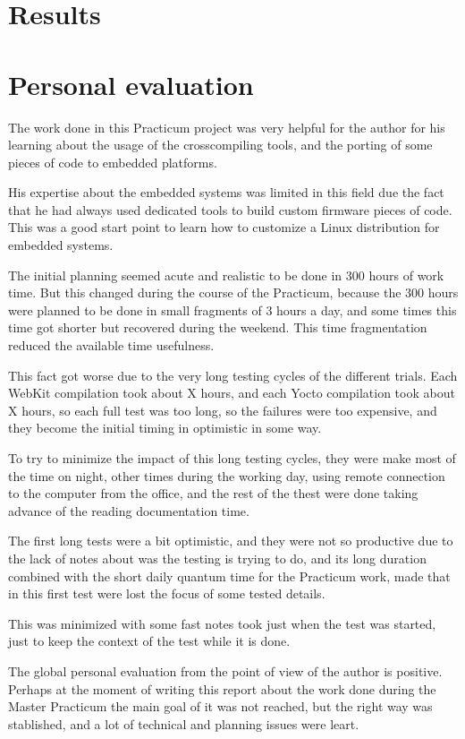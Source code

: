 \documentclass[a4paper,11pt,openany]{report}
\begin{document}
\chapter{Results}


\chapter{Personal evaluation}
The work done in this Practicum project was very helpful for the author for his learning about the usage of the crosscompiling tools, and the porting of some pieces of code to embedded platforms.

His expertise about the embedded systems was limited in this field due the fact that he had always used dedicated tools to build custom firmware pieces of code. This was a good start point to learn how to customize a Linux distribution for embedded systems.

The initial planning seemed acute and realistic to be done in 300 hours of work time. But this changed during the course of the Practicum, because the 300 hours were planned to be done in small fragments of 3 hours a day, and some times this time got shorter but recovered during the weekend. This time fragmentation reduced the available time usefulness.

This fact got worse due to the very long testing cycles of the different trials. Each WebKit compilation took about X hours, and each Yocto compilation took about X hours, so each full test was too long, so the failures were too expensive, and they become the initial timing in optimistic in some way.

To try to minimize the impact of this long testing cycles, they were make most of the time on night, other times during the working day, using remote connection to the computer from the office, and the rest of the thest were done taking advance of the reading documentation time.

The first long tests were a bit optimistic, and they were not so productive due to the lack of notes about was the testing is trying to do, and its long duration combined with the short daily quantum time for the Practicum work, made that in this first test were lost the focus of some tested details.

This was minimized with some fast notes took just when the test was started, just to keep the context of the test while it is done.

The global personal evaluation from the point of view of the author is positive. Perhaps at the moment of writing this report about the work done during the Master Practicum the main goal of it was not reached, but the right way was stablished, and a lot of technical and planning issues were leart.
\end{document}
